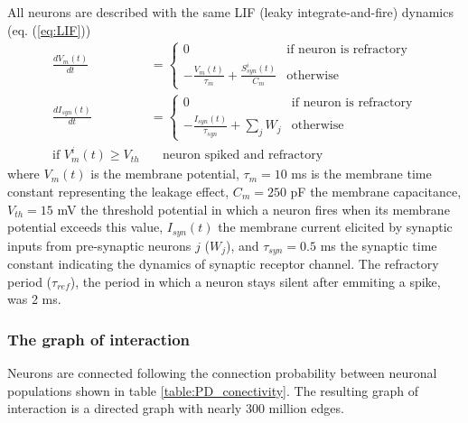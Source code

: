 \documentclass[11pt]{scrartcl}
\begin{document}
All neurons are described with the same LIF (leaky integrate-and-fire) dynamics (eq. (\ref{eq:LIF}))
\begin{equation}
  \begin{aligned}
    \frac{dV_m(t)}{dt} &= \begin{cases} 0 & \text{if neuron is refractory} \\
    -\frac{V_m(t)}{\tau_m} + \frac{S_{syn}^i(t)}{C_m} & \text{otherwise}
    \end{cases} \\
    \frac{dI_{syn}(t)}{dt} &= \begin{cases} 0 & \text{if neuron is refractory} \\
    -\frac{I_{syn}(t)}{\tau_{syn}} + \sum_j{W_j} & \text{otherwise}
    \end{cases} \\
    \text{if } V_m^i(t) \geq V_{th} &\quad \text{neuron spiked and refractory}
  \end{aligned}
  \label{eq:LIF}
\end{equation}
where \(V_m(t)\) is the membrane potential, \(\tau_m = 10\) ms is the membrane time constant representing the leakage effect, \(C_m = 250\) pF the membrane capacitance, \(V_{th} = 15\) mV the threshold potential in which a neuron fires when its membrane potential exceeds this value, \(I_{syn}(t)\) the membrane current elicited by synaptic inputs from pre-synaptic neurons  \(j\) (\(W_j\)), and \(\tau_{syn} = 0.5\) ms the synaptic time constant indicating the dynamics of synaptic receptor channel. The refractory period (\(\tau_{ref}\)), the period in which a neuron stays silent after emmiting a spike, was 2 ms.


\subsubsection{The graph of interaction}
\label{sec:org03c23f7}
\label{orgf7bab06}

Neurons are connected following the connection probability between neuronal populations shown in table \ref{table:PD_conectivity}.
The resulting graph of interaction is a directed graph with nearly 300 million edges.
\end{document}
